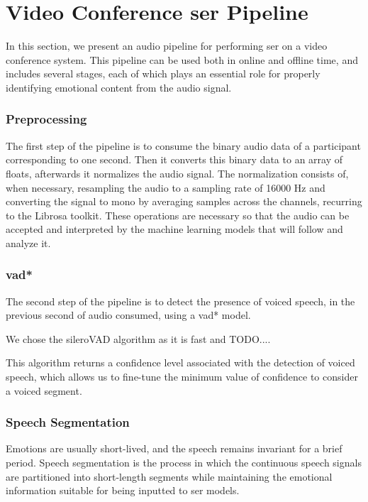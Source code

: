 \chapter{Video Conference \acl{ser} Pipeline}
\label{chapter:ser_conf}

In this section, we present an audio pipeline for performing \ac{ser} on a video conference system. This pipeline can be used both in online and offline time, and includes several stages, each of which plays an essential role for properly identifying emotional content from the audio signal.

\subsection{Preprocessing}

The first step of the pipeline is to consume the binary audio data of a participant corresponding to one second. Then it converts this binary data to an array of floats, afterwards it normalizes the audio signal. The normalization consists of, when necessary, resampling the audio to a sampling rate of 16000 Hz and converting the signal to mono by averaging samples across the channels, recurring to the Librosa toolkit. These operations are necessary so that the audio can be accepted and interpreted by the machine learning models that will follow and analyze it.

\subsection{\acl{vad*}}

The second step of the pipeline is to detect the presence of voiced speech, in the previous second of audio consumed, using a \ac{vad*} model.

We chose the sileroVAD algorithm as it is fast and TODO....

This algorithm returns a confidence level associated with the detection of voiced speech, which allows us to fine-tune the minimum value of confidence to consider a voiced segment.

\subsection{Speech Segmentation}


Emotions are usually short-lived, and the speech remains invariant for a brief period. Speech segmentation is the process in which the continuous speech signals are partitioned into short-length segments while maintaining the emotional information suitable for being inputted to \ac{ser} models.

